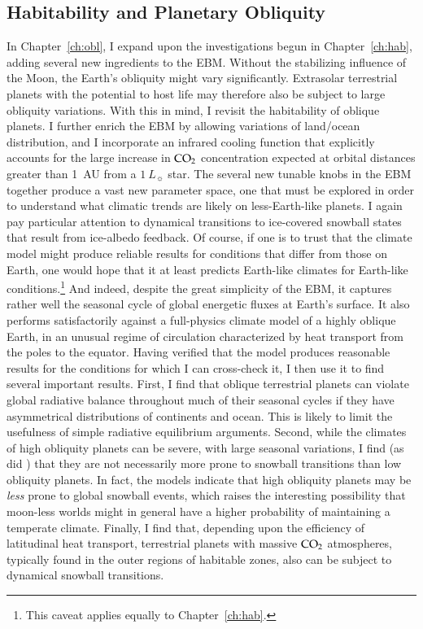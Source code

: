 \subsection[Habitability and Planetary Obliquity]{Habitability and Planetary Obliquity}
\label{intro_ssec:obl}
In Chapter~\ref{ch:obl}, I expand upon the investigations begun in
Chapter~\ref{ch:hab}, adding several new ingredients to the EBM.
Without the stabilizing influence of the Moon, the Earth's obliquity
might vary significantly.  Extrasolar terrestrial planets with the
potential to host life may therefore also be subject to large
obliquity variations.  With this in mind, I revisit the habitability
of oblique planets.  I further enrich the EBM by allowing variations
of land/ocean distribution, and I incorporate an infrared cooling
function that explicitly accounts for the large increase in $\rm CO_2$
concentration expected at orbital distances greater than 1~AU from a
$1~L_\sun$ star.  The several new tunable knobs in the EBM together
produce a vast new parameter space, one that must be explored in order
to understand what climatic trends are likely on less-Earth-like
planets.  I again pay particular attention to dynamical transitions to
ice-covered snowball states that result from ice-albedo feedback.  Of
course, if one is to trust that the climate model might produce
reliable results for conditions that differ from those on Earth, one
would hope that it at least predicts Earth-like climates for
Earth-like conditions.\footnote{This caveat applies equally to
Chapter~\ref{ch:hab}.} And indeed, despite the great simplicity of the
EBM, it captures rather well the seasonal cycle of global energetic
fluxes at Earth's surface.  It also performs satisfactorily against a
full-physics climate model of a highly oblique Earth, in an unusual
regime of circulation characterized by heat transport from the poles
to the equator.  Having verified that the model produces reasonable
results for the conditions for which I can cross-check it, I then use
it to find several important results.  First, I find that oblique
terrestrial planets can violate global radiative balance throughout
much of their seasonal cycles if they have asymmetrical distributions
of continents and ocean.  This is likely to limit the usefulness of
simple radiative equilibrium arguments.  Second, while the climates of
high obliquity planets can be severe, with large seasonal variations,
I find (as did \citet{williams+kasting1997}) that they are not
necessarily more prone to snowball transitions than low obliquity
planets.  In fact, the models indicate that high obliquity planets may
be {\it less} prone to global snowball events, which raises the
interesting possibility that moon-less worlds might in general have a
higher probability of maintaining a temperate climate.  Finally, I
find that, depending upon the efficiency of latitudinal heat
transport, terrestrial planets with massive $\rm CO_2$ atmospheres,
typically found in the outer regions of habitable zones, also can be
subject to dynamical snowball transitions.


